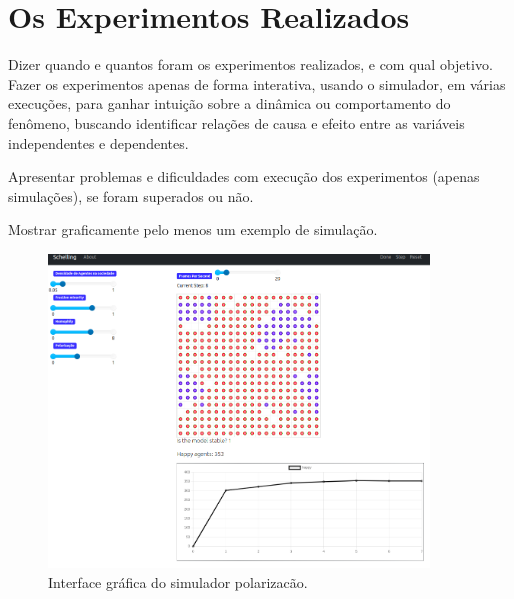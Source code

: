 % 



\section{Os Experimentos Realizados}

Dizer quando e quantos foram os experimentos realizados, e com qual  objetivo. Fazer os experimentos apenas de forma interativa, usando o simulador, em várias execuções, para ganhar intuição sobre a dinâmica ou comportamento do fenômeno, buscando identificar relações de causa e efeito entre as variáveis independentes e dependentes.

Apresentar problemas e dificuldades com execução dos experimentos (apenas simulações), se foram superados ou não.

Mostrar graficamente pelo menos um exemplo de simulação.

\begin{figure}
    \centering
    \includegraphics[width=0.9\textwidth]{3-Simulando-Um-Fenomeno/tarefas/T6-Aprimoramento-Simulacao/estudantes/tarefa-jhcf/simul-polariz-0.1-20221216.png}
    \caption{Interface gráfica do simulador polarizacão.}
    \label{fig:jhcf:polariza}
\end{figure}

